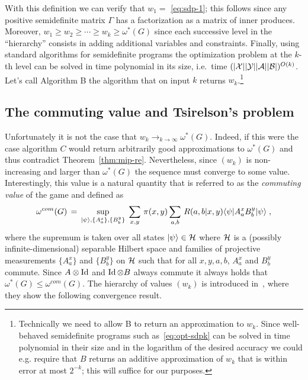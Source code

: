 With this definition we can verify that $w_1 =$ \eqref{eq:sdp-1}; this follows since any positive semidefinite matrix $\Gamma$ has a factorization as a matrix of inner produces. Moreover, $w_1 \geq w_2 \geq \cdots \geq w_k \geq \omega^*(G)$ since each successive level in the ``hierarchy'' consists in adding additional variables and constraints. Finally, using standard algorithms for semidefinite programs the optimization problem at the $k$-th level can be solved in time polynomial in its size, i.e.\ time $(|\mathcal{X}||\mathcal{Y}||\mathcal{A}||\mathcal{B}|)^{O(k)}$.
 Let's call Algorithm B the algorithm that on input $k$ returns $w_k$.\footnote{Technically we need to allow B to return an approximation to $w_k$. Since well-behaved semidefinite programs such as~\eqref{eq:opt-sdpk} can be solved in time polynomial in their size and in the logarithm of the desired accuracy we could e.g. require that $B$ returns an additive approximation of $w_k$ that is within error at most $2^{-k}$; this will suffice for our purposes.} 

\subsection{The commuting value and Tsirelson's problem}

Unfortunately it is not the case that $w_k\to_{k\to\infty} \omega^*(G)$. Indeed, if this were the case algorithm $C$ would return arbitrarily good approximations to $\omega^*(G)$ and thus contradict Theorem~\ref{thm:mip-re}. Nevertheless, since $(w_k)$ is non-increasing and larger than $\omega^*(G)$ the sequence must converge to some value.  Interestingly, this value is a natural quantity that is referred to as the \emph{commuting value} of the game and defined as
\begin{equation}\label{eq:val-com}
\omega^{com}(G) \,=\, \sup_{|\psi\rangle, \{A^x_a\},\{B^y_b\}} \; \sum_{x,y} \,\pi(x,y) \sum_{a,b} \,R(a,b|x,y) \langle\psi| A^x_a  B^y_b |\psi\rangle\;,
\end{equation}
where the supremum is taken over all states $|\psi\rangle \in \mathcal{H}$ where $\mathcal{H}$ is a (possibly infinite-dimensional) separable Hilbert space and families of projective measurements $\{ A^x_a\}$ and $\{  B^y_b \}$ on $\mathcal{H}$ such that for all $x,y,a,b$, $A^x_a$ and $B^y_b$ commute. Since $A \otimes \mathop{\rm Id}\nolimits$ and $\mathop{\rm Id}\nolimits \otimes B$ always commute it always holds that $\omega^*(G) \leq \omega^{com}(G)$. The hierarchy of values $(w_k)$ is introduced in~\cite{navascues2008convergent}, where they show the following convergence result. 

